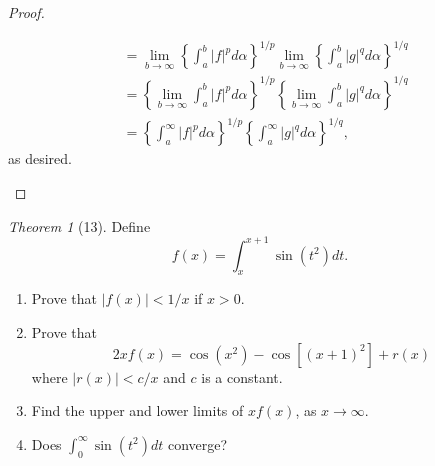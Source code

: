 \documentclass[12pt]{article}
\theoremstyle{remark}
\theoremstyle{named}
\newtheorem*{theorem}{Theorem}
\renewcommand{\a}{\alpha}
\newcommand{\abs}[1]{|#1|}
\begin{document}
\begin{proof}
\begin{enumerate}
\begin{align*}
            &= \lim_{b \to \infty}\left\{\int_a^b \abs{f}^p d\a\right\}^{1/p} \lim_{b \to \infty}\left\{\int_a^b \abs{g}^q d\a\right\}^{1/q} \\
            &= \left\{\lim_{b \to \infty}\int_a^b \abs{f}^p d\a\right\}^{1/p} \left\{\lim_{b \to \infty}\int_a^b \abs{g}^q d\a\right\}^{1/q} \\
            &= \left\{\int_a^\infty \abs{f}^p d\a\right\}^{1/p} \left\{\int_a^\infty \abs{g}^q d\a\right\}^{1/q},
        \end{align*}
        as desired.
    \end{enumerate}
\end{proof}

\begin{theorem}[13]
    Define 
    \[f(x) = \int_x^{x + 1} \sin(t^2)dt.\]
    \begin{enumerate}
        \item Prove that \(\abs{f(x)} < 1 / x\) if \(x > 0\).
        \item Prove that 
        \[2xf(x) = \cos(x^2) - \cos[(x + 1)^2] + r(x)\]
        where \(\abs{r(x)} < c / x\) and \(c\) is a constant.
        \item Find the upper and lower limits of \(x f(x)\), as \(x \to \infty\).
        \item Does \(\int_0^\infty \sin(t^2)dt\) converge?
    \end{enumerate}
\end{theorem}
\end{document}
